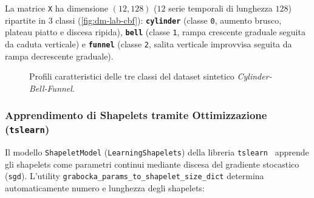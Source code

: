 La matrice \texttt{X} ha dimensione $(12, 128)$ ($12$ serie temporali di lunghezza $128$) ripartite in $3$ classi (\autoref{fig:dm-lab-cbf}): \textbf{\texttt{cylinder}} (classe \texttt{0}, aumento brusco, plateau piatto e discesa ripida), \textbf{\texttt{bell}} (classe \texttt{1}, rampa crescente graduale seguita da caduta verticale) e \textbf{\texttt{funnel}} (classe \texttt{2}, salita verticale improvvisa seguita da rampa decrescente graduale).

\begin{figure}[H]
\centering
{}
\caption{Profili caratteristici delle tre classi del dataset sintetico \textit{Cylinder-Bell-Funnel}.}
\label{fig:dm-lab-cbf}
\end{figure}

\FloatBarrier
\subsubsection{Apprendimento di Shapelets tramite Ottimizzazione (\texttt{tslearn})}
\label{subsec:dm-lab-tslearn}

Il modello \texttt{ShapeletModel} (\texttt{LearningShapelets}) della libreria \texttt{tslearn}~\cite{tavenard2020,grabocka2014} apprende gli shapelets come parametri continui mediante discesa del gradiente stocastico (\texttt{sgd}). L'utility \texttt{grabocka\_params\_to\_\allowbreak shapelet\_size\_dict} determina automaticamente numero e lunghezza degli shapelets:

